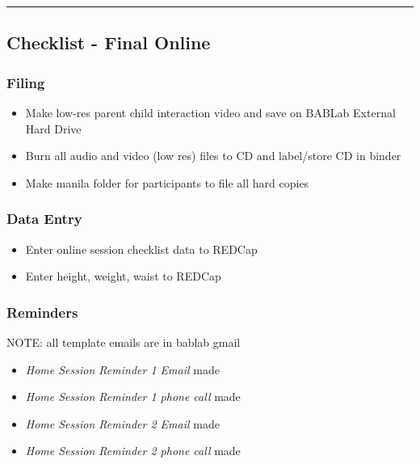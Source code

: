 \documentclass[]{book}
\providecommand{\tightlist}{%
  \setlength{\itemsep}{0pt}\setlength{\parskip}{0pt}}
\begin{document}
\begin{center}\rule{0.5\linewidth}{0.5pt}\end{center}

\hypertarget{checklist---final-online}{%
\subsection{Checklist - Final Online}\label{checklist---final-online}}

\hypertarget{filing-3}{%
\subsubsection{Filing}\label{filing-3}}

\begin{itemize}
\tightlist
\item
  Make low-res parent child interaction video and save on BABLab External Hard Drive
\item
  Burn all audio and video (low res) files to CD and label/store CD in binder
\item
  Make manila folder for participants to file all hard copies
\end{itemize}

\hypertarget{data-entry-1}{%
\subsubsection{Data Entry}\label{data-entry-1}}

\begin{itemize}
\tightlist
\item
  Enter online session checklist data to REDCap
\item
  Enter height, weight, waist to REDCap
\end{itemize}

\hypertarget{reminders-2}{%
\subsubsection{Reminders}\label{reminders-2}}

NOTE: all template emails are in bablab gmail

\begin{itemize}
\tightlist
\item
  \emph{Home Session Reminder 1 Email} made
\item
  \emph{Home Session Reminder 1 phone call} made
\item
  \emph{Home Session Reminder 2 Email} made
\item
  \emph{Home Session Reminder 2 phone call} made
\end{itemize}
\end{document}
